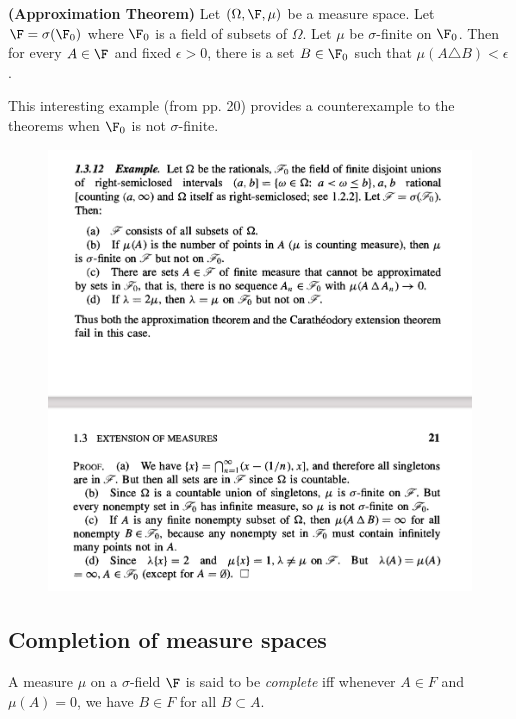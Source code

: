 \documentclass{article} %
\begin{document}
\begin{theorem}{\textbf{(Approximation Theorem)}} Let $(\Omega, \F, \mu)$ be a measure space.  Let $\F = \sigma(\F_0)$ where $\F_0$ is a field of subsets of $\Omega$.  Let $\mu$ be $\sigma$-finite on $\F_0$.  Then for every $A \in \F$ and fixed $\epsilon >0$, there is a set $B \in \F_0$ such that $\mu( A \triangle B) < \epsilon$.  
\label{thm:approximation theorem}	
\end{theorem}


\begin{example}

This interesting example (from \cite{ash2000probability} pp. 20) provides a counterexample to the theorems when $\F_0$ is not $\sigma$-finite. 

\begin{figure}[h!]
\centering
\includegraphics[width=1.\textwidth]{images/example_of_extension}	
\end{figure}
\end{example}

\subsection{Completion of measure spaces}

\begin{definition}
A measure $\mu$ on a $\sigma$-field $\F$ is said to be \textit{complete} iff whenever $A \in F$ and $\mu(A) =0$, we have $B \in F$ for all $B \subset A$.
\end{definition}
\end{document}
